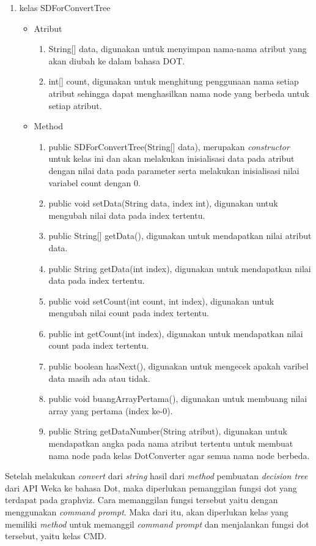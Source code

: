\begin{enumerate}
	\item kelas SDForConvertTree
	\begin{itemize}
		\item Atribut
		\begin{enumerate}
			\item String[] data, digunakan untuk menyimpan nama-nama atribut yang akan diubah ke dalam bahasa DOT.
			\item int[] count, digunakan untuk menghitung penggunaan nama setiap atribut sehingga dapat menghasilkan nama node yang berbeda untuk setiap atribut.
		\end{enumerate}
		\item Method
		\begin{enumerate}
			\item public SDForConvertTree(String[] data), merupakan \textsl{constructor} untuk kelas ini dan akan melakukan inisialisasi data pada atribut dengan nilai data pada parameter serta melakukan inisialisasi nilai variabel count dengan 0.
			\item public void setData(String data, index int), digunakan untuk mengubah nilai data pada index tertentu.
			\item public String[] getData(), digunakan untuk mendapatkan nilai atribut data.
			\item public String getData(int index), digunakan untuk mendapatkan nilai data pada index tertentu.
			\item public void setCount(int count, int index), digunakan untuk mengubah nilai count pada index tertentu.
			\item public int getCount(int index), digunakan untuk mendapatkan nilai count pada index tertentu.
			\item public boolean hasNext(), digunakan untuk mengecek apakah varibel data masih ada atau tidak.
			\item public void buangArrayPertama(), digunakan untuk membuang nilai array yang pertama (index ke-0).
			\item public String getDataNumber(String atribut), digunakan untuk mendapatkan angka pada nama atribut tertentu untuk membuat nama node pada kelas DotConverter agar semua nama node berbeda.
		\end{enumerate}
	\end{itemize}
\end{enumerate}

Setelah melakukan \textsl{convert} dari \textsl{string} hasil dari \textsl{method} pembuatan \textsl{decision tree} dari API Weka ke bahasa Dot, maka diperlukan pemanggilan fungsi dot yang terdapat pada graphviz. Cara memanggilan fungsi tersebut yaitu dengan menggunakan \textsl{command prompt}. Maka dari itu, akan diperlukan kelas yang memiliki \textsl{method} untuk memanggil \textsl{command prompt} dan menjalankan fungsi dot tersebut, yaitu kelas CMD.


